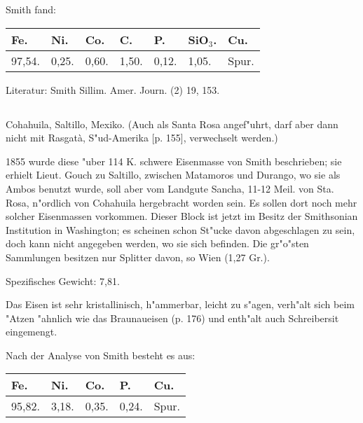 \documentclass[a4paper, 11pt, oneside]{article}
\begin{document}
Smith fand:
\begin{table}[H]
    \centering\swabfamily\Large
    \begin{tabular}{l l l l l l l}
        Fe. & Ni. & Co. & C. & P. & SiO$_{3}$. & Cu. \\ \hline
        97,54. & 0,25. & 0,60. & 1,50. & 0,12. & 1,05. & Spur. \\
    \end{tabular}
\end{table}

\normalsize
Literatur: Smith Sillim. Amer. Journ. (2) 19, 153.

\subsection{}
\LARGE
\paragraph{}
Cohahuila, Saltillo, Mexiko. (Auch als Santa Rosa angef"uhrt, darf aber dann nicht mit Rasgatà, S"ud-Amerika [p. 155], verwechselt werden.)

1855 wurde diese "uber 114 K. schwere Eisenmasse von Smith beschrieben; sie erhielt Lieut. Gouch zu Saltillo, zwischen Matamoros und Durango, wo sie als Ambos benutzt wurde, soll aber vom Landgute Sancha, 11-12 Meil. von Sta. Rosa, n"ordlich von Cohahuila hergebracht worden sein. Es sollen dort noch mehr solcher Eisenmassen vorkommen. Dieser Block ist jetzt im Besitz der Smithsonian Institution in Washington; es scheinen schon St"ucke davon abgeschlagen zu sein, doch kann nicht angegeben werden, wo sie sich befinden. Die gr"o"sten Sammlungen besitzen nur Splitter davon, so Wien (1,27 Gr.).

Spezifisches Gewicht: 7,81.

Das Eisen ist sehr kristallinisch, h"ammerbar, leicht zu s"agen, verh"alt sich beim "Atzen "ahnlich wie das Braunaueisen (p. 176) und enth"alt auch Schreibersit eingemengt.

Nach der Analyse von Smith besteht es aus:
\begin{table}[H]
    \centering\swabfamily\Large
    \begin{tabular}{l l l l l}
        Fe. & Ni. & Co. & P. & Cu. \\ \hline
        95,82. & 3,18. & 0,35. & 0,24. & Spur. \\
    \end{tabular}
\end{table}
\end{document}
